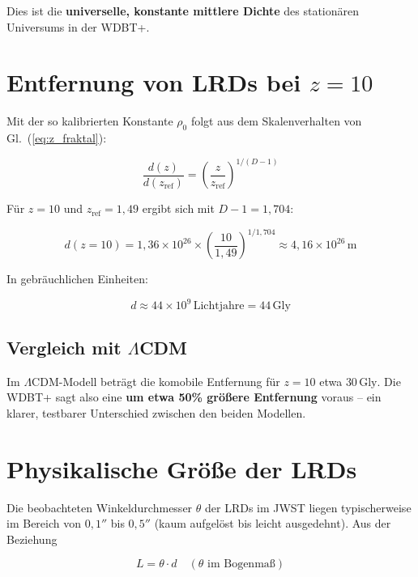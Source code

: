 \documentclass[12pt,a4paper]{article}
\begin{document}
Dies ist die \textbf{universelle, konstante mittlere Dichte} des stationären Universums in der WDBT+.

\section{Entfernung von LRDs bei $z=10$}

Mit der so kalibrierten Konstante $\rho_0$ folgt aus dem Skalenverhalten von Gl.~(\ref{eq:z_fraktal}):

\begin{equation}
\frac{d(z)}{d(z_{\text{ref}})} = \left( \frac{z}{z_{\text{ref}}} \right)^{1/(D-1)}
\label{eq:skalierung}
\end{equation}

Für $z=10$ und $z_{\text{ref}}=1{,}49$ ergibt sich mit $D-1 = 1{,}704$:

\begin{equation}
d(z=10) = 1{,}36 \times 10^{26} \times \left( \frac{10}{1{,}49} \right)^{1/1,704} \approx 4{,}16 \times 10^{26}\,\text{m}
\end{equation}

In gebräuchlichen Einheiten:

\begin{equation}
\boxed{d \approx 44 \times 10^9\,\text{Lichtjahre} = 44\,\text{Gly}}
\end{equation}

\subsection*{Vergleich mit $\Lambda$CDM}

Im $\Lambda$CDM-Modell beträgt die komobile Entfernung für $z=10$ etwa $30\,\text{Gly}$. Die WDBT+ sagt also eine \textbf{um etwa 50\% größere Entfernung} voraus – ein klarer, testbarer Unterschied zwischen den beiden Modellen.

\section{Physikalische Größe der LRDs}

Die beobachteten Winkeldurchmesser $\theta$ der LRDs im JWST liegen typischerweise im Bereich von $0{,}1''$ bis $0{,}5''$ (kaum aufgelöst bis leicht ausgedehnt). Aus der Beziehung

\begin{equation}
L = \theta \cdot d \quad (\theta \text{ im Bogenmaß})
\label{eq:physikalische_groesse}
\end{equation}
\end{document}
